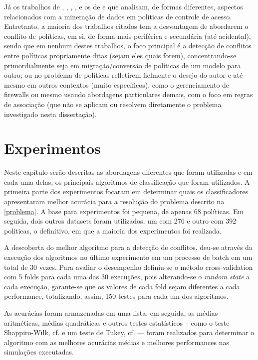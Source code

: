 Já os trabalhos de , , , ,  e os de  e  que analisam, de formas diferentes, aspectos relacionados com a mineração de dados em políticas de controle de acesso. Entretanto, a maioria dos trabalhos citados tem a desvantagem de abordarem o conflito de políticas, em si, de forma mais periférica e secundária (até acidental), sendo que em nenhum destes trabalhos, o foco principal é a detecção de conflitos entre políticas propriamente ditas (sejam eles quais forem), concentrando-se primordialmente seja em migração/conversão de políticas de um modelo para outro; ou no problema de políticas refletirem fielmente o desejo do autor e até mesmo em outros contextos (muito específicos), como o gerenciamento de firewalls ou mesmo usando abordagens particulares demais, com o foco em regras de associação (que não se aplicam ou resolvem diretamente o problema investigado nesta dissertação).

\chapter{Experimentos}\label{resultados} %
Neste capítulo serão descritas as abordagens diferentes que foram utilizadas e em cada uma delas, os principais algoritmos de classificação que foram utilizados. A primeira parte dos experimentos focaram em determinar quais os classificadores apresentaram melhor acurácia para a resolução do problema descrito na \autoref{problema}. A base para experimentos foi pequena, de apenas 68 políticas. Em seguida, dois outros datasets foram utilizados, um com 276 e outro com 392 políticas, o definitivo, em que a maioria dos experimentos foi realizada. 

A descoberta do melhor algoritmo para a detecção de conflitos, deu-se através da execução dos algoritmos no último experimento em um processo de batch em um total de 30 vezes. Para avaliar o desempenho definiu-se o método cross-validation com 5 folds para cada uma das 30 execuções, pois alterando-se o \textit{random state} a cada execução, garante-se que os valores de cada fold sejam diferentes a cada performance, totalizando, assim, 150 testes para cada um dos algoritmos. 

As acurácias foram armazenadas em uma lista, em seguida, as médias aritméticas, médias quadráticas e outros testes estatísticos  -- como o teste Shappiro-Wilk, cf.  e um teste de Tukey, cf.  --- foram realizados para determinar o algoritmo com as melhores acurácias médias e melhores performances nas simulações executadas. 

